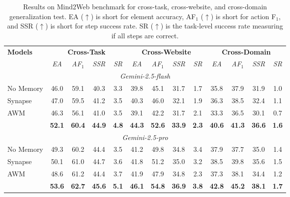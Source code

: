 \begin{table}[!t]
\centering\setlength{\tabcolsep}{5.3pt}
\small
\setlength{\belowcaptionskip}{1pt}
  \caption{Results on Mind2Web benchmark for cross-task, cross-website, and cross-domain generalization test. EA ($\uparrow$) is short for element accuracy, AF$_1$ ($\uparrow$) is short for action F$_1$, and SSR ($\uparrow$) is short for step success rate. SR ($\uparrow$) is the task-level success rate measuring if all steps are correct. }
  \label{table: mind2web}
  \begin{tabular}{lcccccccccccc}
    \toprule
    \multirow{2}{*}{\textbf{Models}} &\multicolumn{4}{c}{\textbf{Cross-Task}}&\multicolumn{4}{c}{\textbf{Cross-Website}}&\multicolumn{4}{c}{\textbf{Cross-Domain}}\\
\cmidrule(lr){2-5}\cmidrule(lr){6-9}\cmidrule(lr){10-13}
&\textit{EA}&\textit{AF$_1$}&\textit{SSR}&\textit{SR}&\textit{EA}&\textit{AF$_1$}&\textit{ SSR}&\textit{SR}&\textit{EA}&\textit{AF$_1$}&\textit{SSR}&\textit{SR} \\
    \midrule
    \multicolumn{13}{c}{\cellcolor{gray!15}\textit{Gemini-2.5-flash}} \\
    No Memory &46.0&59.1&40.3&3.3&39.8&45.1&31.7&1.7&35.8&37.9&31.9&1.0 \\
    Synapse&47.0&59.5&41.2&3.5&40.3&46.0&32.1&1.9&36.3&38.5&32.4&1.1 \\
    AWM & 46.3&56.1&41.0&3.5&39.1&42.2&31.7&2.1&33.3&36.5&30.1&0.7\\
    \ours{} & \textbf{52.1}&\textbf{60.4}&\textbf{44.9}&\textbf{4.8}&\textbf{44.3}&\textbf{52.6}&\textbf{33.9}&\textbf{2.3}&\textbf{40.6}&\textbf{41.3}&\textbf{36.6}&\textbf{1.6}  \\
    \midrule
    \multicolumn{13}{c}{\cellcolor{gray!15}\textit{Gemini-2.5-pro}} \\
    No Memory&49.3&60.2&44.4&3.5&41.2&49.8&34.8&3.4&37.9&37.7&35.0&1.4\\
    Synapse&50.1&61.0&44.7&3.6&41.8&51.2&35.0&3.2&38.5&39.8&35.6&1.5\\
    AWM&48.6&61.2&44.4&3.7&41.9&47.9&34.8&2.3&37.3&38.1&34.4&1.2\\
    \ours{} &\textbf{53.6}&\textbf{62.7}&\textbf{45.6}&\textbf{5.1}&\textbf{46.1}&\textbf{54.8}&\textbf{36.9}&\textbf{3.8}&\textbf{42.8}&\textbf{45.2}&\textbf{38.1}&\textbf{1.7} \\

  \bottomrule
\end{tabular}
\vspace{-5mm}
\end{table}



